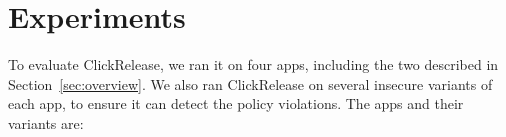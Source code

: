 \documentclass{llncs}
\newcommand{\toolname}{ClickRelease\xspace}
\newcommand{\comment}[3][\color{red}]{{#1{[{#2}: {#3}]}}}
\newcommand{\kris}[1]{\comment[\color{orange}]{kris}{#1}}
\begin{document}

\section{Experiments}
\label{sec:experiments}

To evaluate \toolname{}, we ran it on four apps, including the two
described in Section~\ref{sec:overview}. We also ran \toolname{} on
several insecure variants of each app, to ensure it can detect the
policy violations. The apps and their variants
are:
\end{document}
